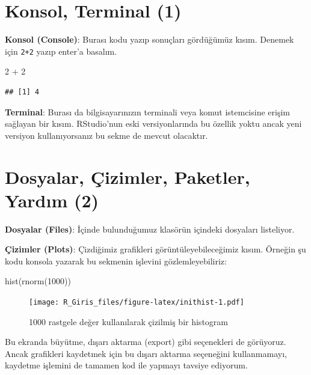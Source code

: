 \documentclass[
]{book}
\newenvironment{Shaded}{\begin{snugshade}}{\end{snugshade}}
\newcommand{\DecValTok}[1]{\textcolor[rgb]{0.00,0.00,0.81}{#1}}
\newcommand{\FunctionTok}[1]{\textcolor[rgb]{0.00,0.00,0.00}{#1}}
\newcommand{\NormalTok}[1]{#1}
\newcommand{\SpecialCharTok}[1]{\textcolor[rgb]{0.00,0.00,0.00}{#1}}
\begin{document}
\hypertarget{konsol-terminal-1}{%
\section{Konsol, Terminal (1)}\label{konsol-terminal-1}}

\textbf{Konsol (Console)}: Burası kodu yazıp sonuçları gördüğümüz kısım. Denemek için \texttt{2+2} yazıp enter'a basalım.

\begin{Shaded}
\begin{Highlighting}[]
\DecValTok{2} \SpecialCharTok{+} \DecValTok{2}
\end{Highlighting}
\end{Shaded}

\begin{verbatim}
## [1] 4
\end{verbatim}

\textbf{Terminal}: Burası da bilgisayarınızın terminali veya komut istemcisine erişim sağlayan bir kısım. RStudio'nun eski versiyonlarında bu özellik yoktu ancak yeni versiyon kullanıyorsanız bu sekme de mevcut olacaktır.

\hypertarget{dosyalar-uxe7izimler-paketler-yardux131m-2}{%
\section{Dosyalar, Çizimler, Paketler, Yardım (2)}\label{dosyalar-uxe7izimler-paketler-yardux131m-2}}

\textbf{Dosyalar (Files)}: İçinde bulunduğumuz klasörün içindeki dosyaları listeliyor.

\textbf{Çizimler (Plots)}: Çizdiğimiz grafikleri görüntüleyebileceğimiz kısım. Örneğin şu kodu konsola yazarak bu sekmenin işlevini gözlemleyebiliriz:

\begin{Shaded}
\begin{Highlighting}[]
\FunctionTok{hist}\NormalTok{(}\FunctionTok{rnorm}\NormalTok{(}\DecValTok{1000}\NormalTok{))}
\end{Highlighting}
\end{Shaded}

\begin{figure}
\centering
\texttt{[image: R\_Giris\_files/figure-latex/inithist-1.pdf]}
\caption{\label{fig:inithist}1000 rastgele değer kullanılarak çizilmiş bir histogram}
\end{figure}

Bu ekranda büyütme, dışarı aktarma (export) gibi seçenekleri de görüyoruz. Ancak grafikleri kaydetmek için bu dışarı aktarma seçeneğini kullanmamayı, kaydetme işlemini de tamamen kod ile yapmayı tavsiye ediyorum.
\end{document}
